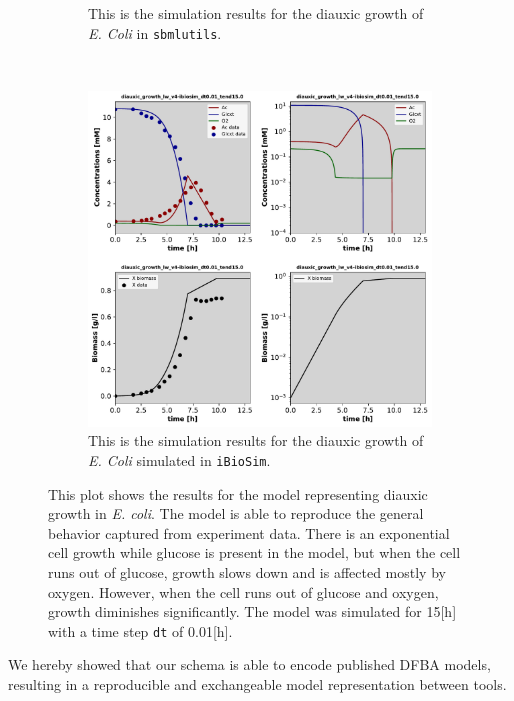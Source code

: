 \documentclass{bioinfo}
\begin{document}
\begin{figure}[!t]
\begin{subfigure}[t]{0.5\textwidth}
	\caption{This is the simulation results for the diauxic growth of \emph{E. Coli} in \texttt{sbmlutils}.}\label{diauxic_sbmlutils}
    \end{subfigure}
    ~
    \begin{subfigure}[t]{0.5\textwidth}	\centerline{\includegraphics[width=\linewidth]{figures/Fig5_diauxic_growth_lw_v4-ibiosim_dt0_01_tend15_0.pdf}}
	\caption{This is the simulation results for the diauxic growth of \emph{E. Coli} simulated in \texttt{iBioSim}. }\label{diauxic_ibiosim}
    \end{subfigure}
    \caption{This plot shows the results for the model representing diauxic growth in \emph{E. coli}. The model is able to reproduce the general behavior captured from experiment data. There is an exponential cell growth while glucose is present in the model, but when the cell runs out of glucose, growth slows down and is affected mostly by oxygen. However, when the cell runs out of glucose and oxygen, growth diminishes significantly. The model was simulated for 15[h] with a time step \texttt{dt} of 0.01[h].}\label{diauxic_example}
\end{figure}

We hereby showed that our schema is able to encode published DFBA models, resulting in a reproducible and exchangeable model representation between tools.
\end{document}

